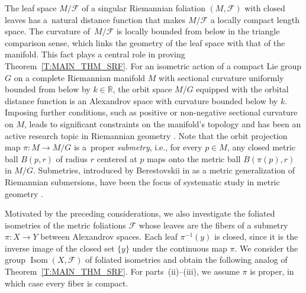 \documentclass[pdftex]{sigma}
\numberwithin{equation}{section}
\theoremstyle{definition}
\DeclareMathOperator{\Iso}{Isom}
\newcommand{\R}{\mathbb{R}} %
\newcommand{\fol}{\mathcal{F}}
\begin{document}
The leaf space $M/\fol$ of a singular Riemannian foliation $(M,\fol)$ with closed leaves has a~natural distance function that makes $M/\fol$ a locally compact length space. The curvature of~$M/\fol$ is locally bounded from below in the triangle comparison sense, which links the geometry of the leaf space with that of the manifold. This fact plays a central role in proving Theorem~\ref{T:MAIN_THM_SRF}.
For an isometric action of a compact Lie group $G$ on a complete Riemannian manifold $M$ with sectional curvature uniformly bounded from below by $k\in \R$, the orbit space $M/G$ equipped with the orbital distance function is an Alexandrov space with curvature bounded below by $k$. Imposing further conditions, such as positive or non-negative sectional curvature on $M$, leads to significant constraints on the manifold's topology and has been an active research topic in Riemannian geometry \cite{Grove2002,Grove2017,Wilking2007}.
Note that the orbit projection map $\pi\colon M\to M/G$ is a~proper \emph{submetry}, i.e., for every $p\in M$, any closed metric ball $B(p,r)$ of radius $r$ centered at $p$ maps onto the metric ball $B(\pi(p),r)$ in $M/G$. Submetries, introduced by Berestovskii in \cite{Berestovskii1987} as a metric generalization of Riemannian submersions, have been the focus of systematic study in metric geometry \cite{BeretovskiiGuijarro2000,GuijarroWalschap2011,KapovitchLytchak2022,Lytchak,Lytchak2024,LytchakWilking2024}.

Motivated by the preceding considerations, we also investigate the foliated isometries of the metric foliations $\fol$ whose leaves are the fibers of a submetry $\pi\colon X\to Y$ between Alexandrov spaces. Each leaf $\pi^{-1}(y)$ is closed, since it is the inverse image of the closed set $\{y\}$ under the continuous map $\pi$.
We consider the group $\Iso(X,\fol)$ of foliated isometries and obtain the following analog of Theorem~\ref{T:MAIN_THM_SRF}. For parts~(ii)--(iii), we assume $\pi$ is proper, in which case every fiber is compact.
\end{document}
